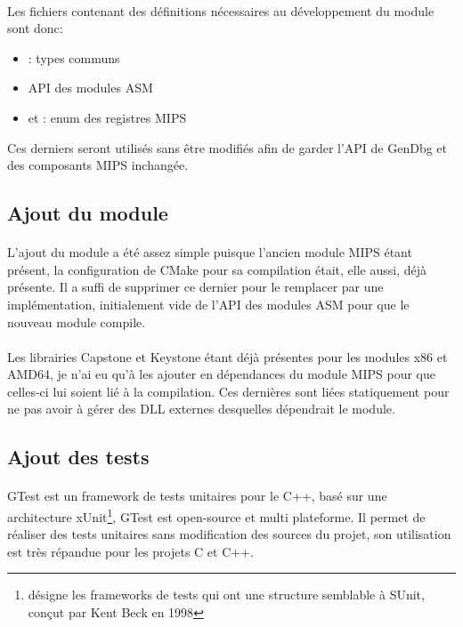 \documentclass[11pt, book, english, french, standardlists]{upmethodology-document}
\begin{document}
				\paragraph*{}
					Les fichiers contenant des définitions nécessaires au développement du module sont donc:
					\begin{itemize}
						\item {}: types communs
						\item {} \gls{API} des modules ASM
						\item {} et : enum des registres MIPS
					\end{itemize}
					Ces derniers seront utilisés sans être modifiés afin de garder l'\gls{API} de GenDbg et des composants MIPS inchangée.
			\subsection{Ajout du module}
				\paragraph*{}
					L'ajout du module a été assez simple puisque l'ancien module \acrshort{MIPS} étant présent, la configuration de CMake pour sa compilation était, elle aussi, déjà présente. Il a suffi de supprimer ce dernier pour le remplacer par une implémentation, initialement vide de l'\gls{API} des modules ASM pour que le nouveau module compile.
				\paragraph*{}
					Les librairies Capstone et Keystone étant déjà présentes pour les modules x86 et AMD64, je n'ai eu qu'à les ajouter en dépendances du module \acrshort{MIPS} pour que celles-ci lui soient lié à la compilation. Ces dernières sont liées statiquement pour ne pas avoir à gérer des \acrshort{DLL} externes desquelles dépendrait le module.
			\subsection{Ajout des tests}
				\paragraph*{}
					GTest est un framework de tests unitaires pour le C++, basé sur une architecture xUnit\footnote{désigne les frameworks de tests qui ont une structure semblable à SUnit, conçut par Kent Beck en 1998}, \gls{GTest} est open-source et multi plateforme. Il permet de réaliser des tests unitaires sans modification des sources du projet, son utilisation est très répandue pour les projets C et C++.
\end{document}
